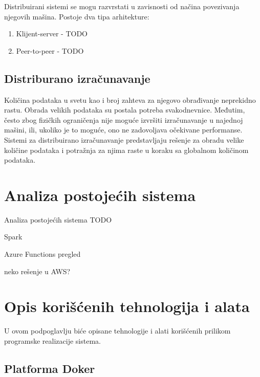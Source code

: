 \documentclass[12pt,oneside]{memoir}
\begin{document}
Distribuirani sistemi se mogu razvrstati u zavisnosti od načina povezivanja njegovih mašina. Postoje dva tipa arhitekture:
\begin{enumerate}
\item Klijent-server - TODO
\item Peer-to-peer - TODO
\end{enumerate}



\subsection{Distriburano izračunavanje}

Količina podataka u svetu kao i broj zahteva za njegovo obrađivanje neprekidno rastu. Obrada velikih podataka su postala potreba svakodnevnice. Međutim, često zbog fizičkih ograničenja nije moguće izvršiti izračunavanje u najednoj mašini, ili, ukoliko je to moguće, ono ne zadovoljava očekivane performanse. Sistemi za distribuirano izračunavanje predstavljaju rešenje za obradu velike količine podataka i potražnja za njima raste u koraku sa globalnom količinom podataka.

\section{Analiza postojećih sistema}
\label{sec:postojeca_resenja}

Analiza postojećih sistema TODO

Spark \cite{Spark}

Azure Functions pregled

neko rešenje u AWS?


\section{Opis korišćenih tehnologija i alata}

U ovom podpoglavlju biće opisane tehnologije i alati korišćenih prilikom programske realizacije sistema.

\subsection{Platforma Doker}
\label{subs:docker_platform}
\end{document}
